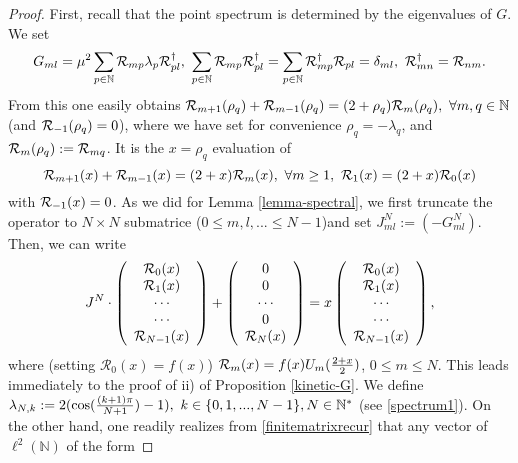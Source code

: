 \documentclass[a4paper]{jpconf}
\numberwithin{equation}{section}
\theoremstyle{nonumberplain}
\newtheorem{proof}{Proof}
\begin{document}
\begin{proof}
First, recall that the point spectrum is determined by the eigenvalues of $G$. We set 
\begin{equation}
G_{ml}=\mu^2\sum_{p\in\mathbb{N}}{\cal{R}}_{mp}\lambda_p{\cal{R}}^\dag_{pl},\ \sum_{p\in\mathbb{N}}{\cal{R}}_{mp}{\cal{R}}^\dag_{pl}=\sum_{p\in\mathbb{N}}{\cal{R}}^\dag_{mp}{\cal{R}}_{pl}=\delta_{ml},\ {\cal{R}}^\dag_{mn}={\cal{R}}_{nm}\label{unitarytrans}.
\end{equation}
From this one easily obtains ${\cal{R}}_{m+1}(\rho_q)+{\cal{R}}_{m-1}(\rho_q)=(2+\rho_q){\cal{R}}_{m}(\rho_q),\ \forall m,q\in\mathbb{N}$ (and ${\cal{R}}_{-1}(\rho_q)=0$), where we have set for convenience $\rho_q=-\lambda_q$, and ${\cal{R}}_{m}(\rho_q):={\cal{R}}_{mq}$. It is the $x=\rho_q$ evaluation of
\begin{equation}
{\cal{R}}_{m+1}(x)+{\cal{R}}_{m-1}(x)=(2+x){\cal{R}}_{m}(x),\ \forall m\ge1,\ {\cal{R}}_1(x)=(2+x){\cal{R}}_0(x) \label{chebyshev-gene}
\end{equation}
with ${\cal{R}}_{-1}(x)=0$. As we did for Lemma \ref{lemma-spectral}, we first truncate the operator to $N\times N$ submatrice ($0\le m,l,...\le N-1$)and set $J^N_{ml}:=(-G^N_{ml})$. Then, we can write 
\begin{equation}
J^N\cdot \left(\begin{array}{c}
\mathcal{R}_0(x)\\
\mathcal{R}_1(x)\\ 
\cdots \\
\cdots \\
\mathcal{R}_{N-1}(x)
  \end{array}  \right) + \left(\begin{array}{c}
 0\\
0\\
\cdots \\ 
0 \\
{\cal{R}}_N(x)
  \end{array}  \right)=x\left(\begin{array}{c}
\mathcal{R}_0(x)\\
\mathcal{R}_1(x)\\ 
\cdots \\
\cdots \\
\mathcal{R}_{N-1}(x)
  \end{array}  \right)\label{finitematrixrecur},
\end{equation}
where (setting $\mathcal{R}_0(x)=f(x)$) ${\cal{R}}_m(x)=f(x)U_m({{2+x}\over{2}})$, $0\le m\le N$. This leads immediately to the proof of ii) of Proposition \ref{kinetic-G}. We define $\lambda_{N,k}:=2(\cos({{(k+1)\pi}\over{N+1}})-1), \ k\in\{0,1,...,N-1\}, N\in\mathbb{N}^*$ (see \eqref{spectrum1}). On the other hand, one readily realizes from \eqref{finitematrixrecur} that any vector of $\ell^2(\mathbb{N})$ of the form 

\end{proof}
\end{document}
